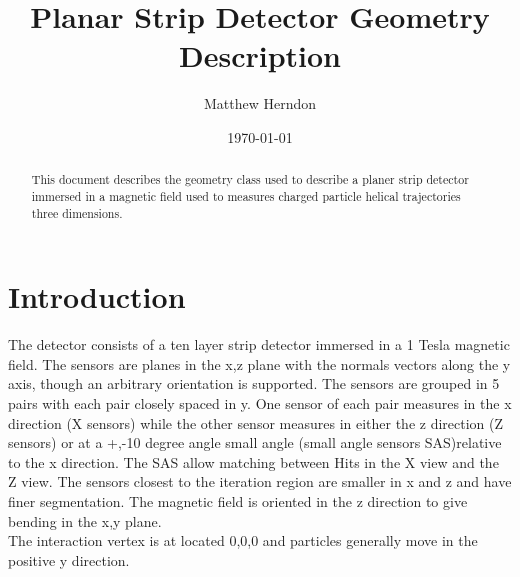 \documentclass[aps,prd,superscriptaddress,floatfix]{revtex4}
\begin{document}
\author {Matthew Herndon}

\address{University of Wisconsin, Madison, Wisconsin, USA}

\date{\today}


\title{  
\vspace{0.5cm}
Planar Strip Detector Geometry Description
}


\begin{abstract}
\vskip 0.5cm
\noindent
This document describes the geometry class used to describe a planer strip
detector immersed in a magnetic field used to measures charged particle helical trajectories three dimensions.  
\end{abstract}

\maketitle

\vspace{0.3cm}


\section{Introduction}
The detector consists of a ten layer strip detector immersed in a 1
Tesla magnetic field.  The sensors are planes in the x,z plane with
the normals vectors along the y axis, though an arbitrary orientation is supported.
The sensors are grouped in 5 pairs with each pair closely spaced in y.  One sensor of each pair
measures in the x  direction (X sensors) while the other sensor measures in either the z direction (Z sensors) 
or at a +,-10 degree angle small angle (small angle sensors SAS)relative to the x direction.  The SAS allow matching
between Hits in the X view and the Z view.  The sensors closest to the iteration region are smaller in x and z and
have finer segmentation.  The magnetic field is oriented in the z direction to give
bending in the x,y plane. 
\\

The interaction vertex is at located 0,0,0 and particles generally move in the positive y direction.  
\\
\end{document}
